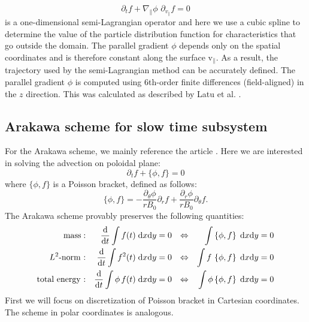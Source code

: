 \begin{equation}
    \partial_t f + \nabla_\parallel \phi\,\, \partial_{v_{\parallel}} f = 0
\end{equation}
is a one-dimensional semi-Lagrangian operator and here we use a cubic spline to determine the value of the particle distribution function for characteristics that go outside the domain. The parallel gradient $\phi$ depends only on the spatial coordinates and is therefore constant along the surface v$_\parallel$. As a result, the trajectory used by the semi-Lagrangian method can be accurately defined. The parallel gradient $\phi$ is computed using 6th-order finite differences (field-aligned) in the $z$ direction. This was calculated as described by Latu et al. \cite{Latu_2017}.

\subsection{Arakawa scheme for slow time subsystem}

For the Arakawa scheme, we mainly reference the article \cite{Arakawa_1966}. Here we are interested in solving the advection on poloidal plane:
\begin{equation}
 \partial_t f + \{\phi, f\} = 0
\end{equation}
where $\{\phi,f\}$ is a Poisson bracket, defined as follows:
\begin{equation}
 \{\phi,f\}=-\frac{\partial_\theta\phi}{rB_0}\partial_r f + \frac{\partial_r\phi}{rB_0}\partial_\theta f.
\end{equation}
The Arakawa scheme provably preserves the following quantities:
	\begin{align*}
		\text{mass} : && \frac{\text{d}}{\text{d} t} \int f(t) \;\text{d} x \text{d} y & = 0 & \Leftrightarrow && \int\left\{ \phi, f \right\} \;\text{d} x \text{d} y & = 0 \\
		L^2\text{-norm :} && \frac{\text{d}}{\text{d} t} \int f^2(t) \;\text{d} x \text{d} y & = 0 & \Leftrightarrow && \int f \, \left\{ \phi, f \right\} \;\text{d} x \text{d} y & = 0 \\
		\text{total energy :} && \frac{\text{d}}{\text{d} t} \int \phi \, f(t) \;\text{d} x \text{d} y & = 0 & \Leftrightarrow && \int \phi \left\{ \phi, f \right\} \;\text{d} x \text{d} y & = 0
	\end{align*}
First we will focus on discretization of Poisson bracket in Cartesian coordinates. The scheme in polar coordinates is analogous.\\

